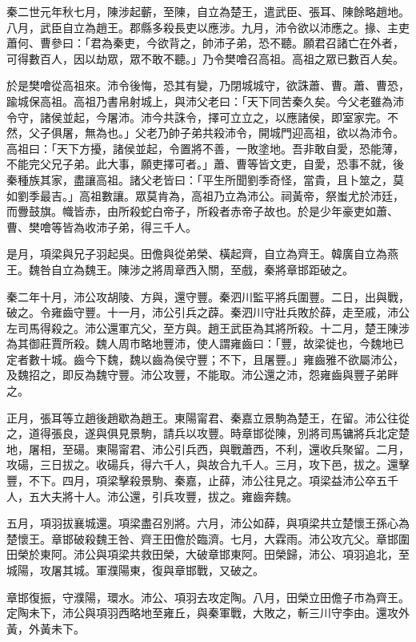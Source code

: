 \begin{pinyinscope}
秦二世元年秋七月，陳涉起蘄，至陳，自立為楚王，遣武臣、張耳、陳餘略趙地。八月，武臣自立為趙王。郡縣多殺長吏以應涉。九月，沛令欲以沛應之。掾、主吏蕭何、曹參曰：「君為秦吏，今欲背之，帥沛子弟，恐不聽。願君召諸亡在外者，可得數百人，因以劫眾，眾不敢不聽。」乃令樊噲召高祖。高祖之眾已數百人矣。

於是樊噲從高祖來。沛令後悔，恐其有變，乃閉城城守，欲誅蕭、曹。蕭、曹恐，踰城保高祖。高祖乃書帛射城上，與沛父老曰：「天下同苦秦久矣。今父老雖為沛令守，諸侯並起，今屠沛。沛今共誅令，擇可立立之，以應諸侯，即室家完。不然，父子俱屠，無為也。」父老乃帥子弟共殺沛令，開城門迎高祖，欲以為沛令。高祖曰：「天下方擾，諸侯並起，令置將不善，一敗塗地。吾非敢自愛，恐能薄，不能完父兄子弟。此大事，願吏擇可者。」蕭、曹等皆文吏，自愛，恐事不就，後秦種族其家，盡讓高祖。諸父老皆曰：「平生所聞劉季奇怪，當貴，且卜筮之，莫如劉季最吉。」高祖數讓。眾莫肯為，高祖乃立為沛公。祠黃帝，祭蚩尤於沛廷，而釁鼓旗。幟皆赤，由所殺蛇白帝子，所殺者赤帝子故也。於是少年豪吏如蕭、曹、樊噲等皆為收沛子弟，得三千人。

是月，項梁與兄子羽起吳。田儋與從弟榮、橫起齊，自立為齊王。韓廣自立為燕王。魏咎自立為魏王。陳涉之將周章西入關，至戲，秦將章邯距破之。

秦二年十月，沛公攻胡陵、方與，還守豐。秦泗川監平將兵圍豐。二日，出與戰，破之。令雍齒守豐。十一月，沛公引兵之薜。秦泗川守壯兵敗於薛，走至戚，沛公左司馬得殺之。沛公還軍亢父，至方與。趙王武臣為其將所殺。十二月，楚王陳涉為其御莊賈所殺。魏人周市略地豐沛，使人謂雍齒曰：「豐，故梁徙也，今魏地已定者數十城。齒今下魏，魏以齒為侯守豐；不下，且屠豐。」雍齒雅不欲屬沛公，及魏招之，即反為魏守豐。沛公攻豐，不能取。沛公還之沛，怨雍齒與豐子弟畔之。

正月，張耳等立趙後趙歇為趙王。東陽甯君、秦嘉立景駒為楚王，在留。沛公往從之，道得張良，遂與俱見景駒，請兵以攻豐。時章邯從陳，別將司馬镛將兵北定楚地，屠相，至碭。東陽甯君、沛公引兵西，與戰蕭西，不利，還收兵聚留。二月，攻碭，三日拔之。收碭兵，得六千人，與故合九千人。三月，攻下邑，拔之。還擊豐，不下。四月，項梁擊殺景駒、秦嘉，止薛，沛公往見之。項梁益沛公卒五千人，五大夫將十人。沛公還，引兵攻豐，拔之。雍齒奔魏。

五月，項羽拔襄城還。項梁盡召別將。六月，沛公如薛，與項梁共立楚懷王孫心為楚懷王。章邯破殺魏王咎、齊王田儋於臨濟。七月，大霖雨。沛公攻亢父。章邯圍田榮於東阿。沛公與項梁共救田榮，大破章邯東阿。田榮歸，沛公、項羽追北，至城陽，攻屠其城。軍濮陽東，復與章邯戰，又破之。

章邯復振，守濮陽，環水。沛公、項羽去攻定陶。八月，田榮立田儋子市為齊王。定陶未下，沛公與項羽西略地至雍丘，與秦軍戰，大敗之，斬三川守李由。還攻外黃，外黃未下。


\end{pinyinscope}
